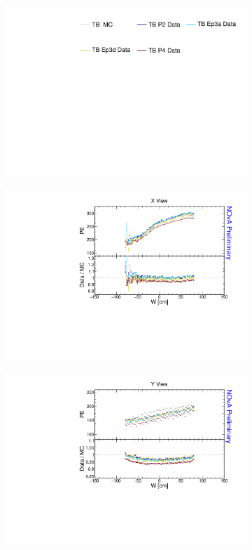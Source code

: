 \begin{figure}[!ht]
  \begin{subfigure}{\textwidth}
  \centering
    \includegraphics[height=0.2\linewidth]{essentialsec_tb/legend.pdf}
  \end{subfigure}
  \vspace*{2mm}

  \begin{subfigure}{0.5\textwidth}
    \includegraphics[width=\linewidth]{essentialsec_tb/pe_w_x.pdf}
  \end{subfigure}
  \begin{subfigure}{0.5\textwidth}
    \includegraphics[width=\linewidth]{essentialsec_tb/pe_w_y.pdf}

\end{subfigure}
\end{figure}
